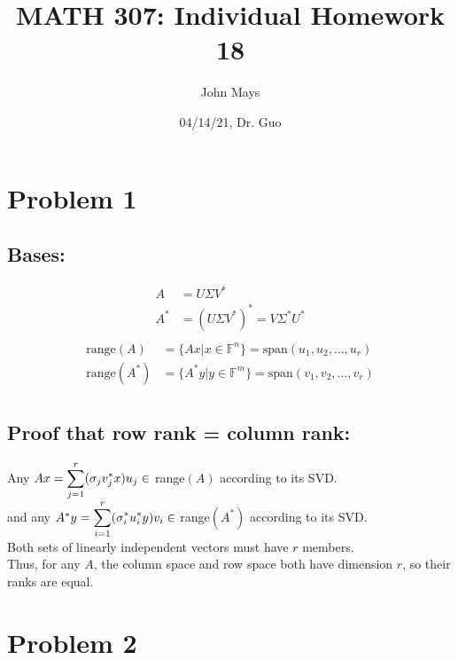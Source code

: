 \documentclass[fleqn]{article}
\title{\textbf{MATH 307: Individual Homework 18}}
\author{John Mays}
\date{04/14/21, Dr. Guo}
\begin{document}
\maketitle

\section*{Problem 1}
\subsection*{Bases:}
\begin{equation*}
    \begin{split}
        A &= U\Sigma V^{*} \\
        A^{*} &= (U\Sigma V^{*})^{*} = V \Sigma^{*} U^{*} \\
    \end{split}
\end{equation*}
\begin{equation*}
    \begin{split}
        \text{range}(A) &= \{Ax | x \in \mathbb{F}^{n}\} = \text{span}(u_1,u_2, \dots, u_r)\\
        \text{range}(A^{*}) &=  \{A^{*}y | y \in \mathbb{F}^{m}\} = \text{span}(v_1,v_2, \dots, v_r)\\
    \end{split}
\end{equation*}
\subsection*{Proof that row rank = column rank:}
Any $Ax = \mathlarger{\sum_{j=1}^{r}(\sigma_j v_j^{*} x)u_j} \in $ range$(A)$ according to its SVD.\\
and any $A^{*}y = \mathlarger{\sum_{i=1}^{r}(\sigma_i^{*} u_i^{*} y)v_i} \in $ range$(A^{*})$ according to its SVD.\\
\linebreak
Both sets of linearly independent vectors must have $r$ members.\\
Thus, for any $A$, the column space and row space both have dimension $r$, so their ranks are equal.
\pagebreak
\section*{Problem 2}
\end{document}
